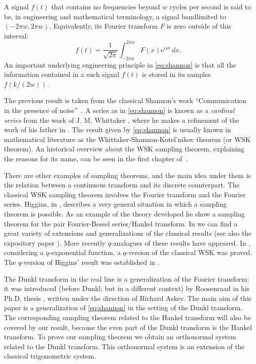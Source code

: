 \documentclass[11pt]{amsart}
\theoremstyle{plain}
\begin{document}
A signal $f(t)$ that contains no frequencies beyond $w$ cycles per second is said to be, in engineering and mathematical terminology, a signal bandlimited to $(-2\pi w,2\pi w)$. Equivalently, its Fourier transform $F$ is zero outside of this interval:
\[
  f(t) = \frac{1}{\sqrt{2\pi}}\int_{-2\pi w}^{2\pi w}F(x)e^{ixt}\, dx.
\]
An important underlying engineering principle in \eqref{eq:shannon} is that all the information contained
in a such signal $f(t)$ is stored in its samples $f(k/(2w))$.

The previous result is taken from the classical Shannon's work ``Communication in the presence of noise''~\cite{Shannon}. A series as in \eqref{eq:shannon} is known as a \textit{cardinal series} from the work of J. M. Whittaker \cite{Whitson}, where he makes a refinement of the work of his father in \cite{Whitfather}. The result given by \eqref{eq:shannon} is usually known in mathematical literature as the Whittaker-Shannon-Kotel'nikov theorem (or WSK theorem). An historical overview about the WSK sampling theorem, explaining the reasons for its name, can be seen in the first chapter of~\cite{Zayed}. 

There are other examples of sampling theorems, and the main idea under them is the relation between a continuous transform and its discrete counterpart. The classical WSK sampling theorem involves the Fourier transform and the Fourier series. Higgins, in \cite{Higgins}, describes a very general situation in which a sampling theorem is possible. As an example of the theory developed he show a sampling theorem for the pair Fourier-Bessel series/Hankel transform. In \cite{Zayed} we can find a great variety of extensions and generalizations of the classical results (see also the expository paper \cite{Garcia}). More recently $q$-analogues of these results have appeared. In \cite{Ismail-Zayed}, considering a $q$-exponential function, a $q$-version of the classical WSK was proved. The $q$-version of Higgins' result was established in \cite{Abreu}. 

The Dunkl transform in the real line is a generalization of the Fourier transform;
it was introduced (before Dunkl, but in a different context) by Roosenraad in his Ph.D. thesis \cite{Roosenraad}, written under the direction of Richard Askey.
The main aim of this paper is a generalization of \eqref{eq:shannon} in the setting of the Dunkl transform. The corresponding sampling theorem related to the Hankel transform will also be covered by our result, because the even part of the Dunkl transform is the Hankel transform.
To prove our sampling theorem we obtain an orthonormal system related to the Dunkl transform. This orthonormal system is an extension of the classical trigonometric system.
\end{document}
